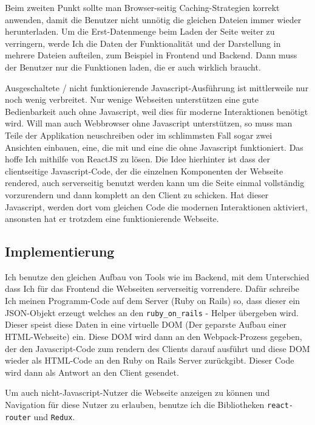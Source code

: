 \documentclass[a4paper,10pt]{scrartcl}
\begin{document}
    Beim zweiten Punkt sollte man Browser-seitig Caching-Strategien korrekt
    anwenden, damit die Benutzer nicht unnötig die gleichen Dateien immer wieder
    herunterladen.
    Um die Erst-Datenmenge beim Laden der Seite weiter zu verringern, werde Ich
    die Daten der Funktionalität und der Darstellung in mehrere Dateien
    aufteilen, zum Beispiel in Frontend und Backend.
    Dann muss der Benutzer nur die Funktionen laden, die er auch wirklich
    braucht.

    Ausgeschaltete / nicht funktionierende Javascript-Ausführung ist
    mittlerweile nur noch wenig verbreitet.
    Nur wenige Webseiten unterstützen eine gute Bedienbarkeit auch ohne
    Javascript, weil dies für moderne Interaktionen benötigt wird.
    Will man auch Webbrowser ohne Javascript unterstützen, so muss man Teile
    der Applikation neuschreiben oder im schlimmsten Fall sogar zwei Ansichten
    einbauen, eine, die mit und eine die ohne Javascript funktioniert.
    Das hoffe Ich mithilfe von ReactJS zu lösen.
    Die Idee hierhinter ist dass der clientseitige Javascript-Code, der die
    einzelnen Komponenten der Webseite rendered, auch serverseitig benutzt
    werden kann um die Seite einmal  vollständig vorzurendern und dann komplett
    an den Client zu schicken.
    Hat dieser Javascript, werden dort vom gleichen Code die modernen
    Interaktionen aktiviert, ansonsten hat er trotzdem eine funktionierende
    Webseite.

  \subsection{Implementierung}

    Ich benutze den gleichen Aufbau von Tools wie im Backend, mit dem
    Unterschied dass Ich für das Frontend die Webseiten serverseitig vorrendere.
    Dafür schreibe Ich meinen Programm-Code auf dem Server (Ruby on Rails) so,
    dass dieser ein JSON-Objekt erzeugt welches an den
    \lstinline{ruby_on_rails} - Helper übergeben wird.
    Dieser speist diese Daten in eine virtuelle DOM (Der geparste Aufbau einer
    HTML-Webseite) ein.
    Diese DOM wird dann an den Webpack-Prozess gegeben, der den Javascript-Code
    zum rendern des Clients darauf ausführt und diese DOM wieder als HTML-Code
    an den Ruby on Rails Server zurückgibt.
    Dieser Code wird dann als Antwort an den Client gesendet.

    Um auch nicht-Javascript-Nutzer die Webseite anzeigen zu können und
    Navigation für diese Nutzer zu erlauben, benutze ich die Bibliotheken
    \lstinline{react-router} und \lstinline{Redux}.
\end{document}
